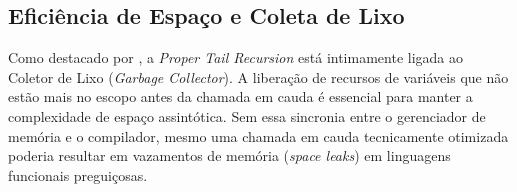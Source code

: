 \documentclass[12pt, a4paper]{article}
\begin{document}
\subsection{Eficiência de Espaço e Coleta de Lixo}

Como destacado por \autocite{clinger1998}, a \textit{Proper Tail Recursion} está intimamente ligada ao Coletor de Lixo (\textit{Garbage Collector}). A liberação de recursos de variáveis que não estão mais no escopo antes da chamada em cauda é essencial para manter a complexidade de espaço assintótica. Sem essa sincronia entre o gerenciador de memória e o compilador, mesmo uma chamada em cauda tecnicamente otimizada poderia resultar em vazamentos de memória (\textit{space leaks}) em linguagens funcionais preguiçosas.

\newpage
\printbibliography[title={Referências}]
\end{document}
